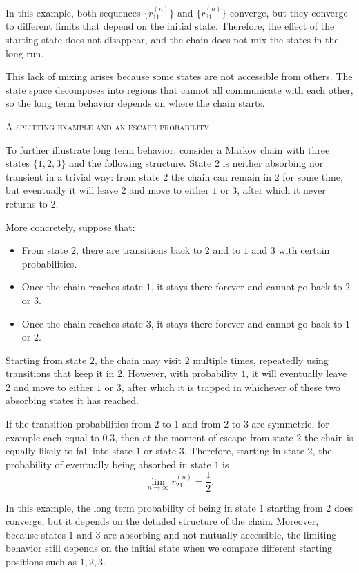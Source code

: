 In this example, both sequences \(\{r_{11}^{(n)}\}\) and \(\{r_{31}^{(n)}\}\) converge, but they converge to different limits that depend on the initial state.
Therefore, the effect of the starting state does not disappear, and the chain does not mix the states in the long run.

This lack of mixing arises because some states are not accessible from others.
The state space decomposes into regions that cannot all communicate with each other, so the long term behavior depends on where the chain starts.

\bigskip
\textsc{A splitting example and an escape probability}

To further illustrate long term behavior, consider a Markov chain with three states \(\{1,2,3\}\) and the following structure.
State \(2\) is neither absorbing nor transient in a trivial way: from state \(2\) the chain can remain in \(2\) for some time, but eventually it will leave \(2\) and move to either \(1\) or \(3\), after which it never returns to \(2\).

More concretely, suppose that:
\begin{itemize}
\item From state \(2\), there are transitions back to \(2\) and to \(1\) and \(3\) with certain probabilities.
\item Once the chain reaches state \(1\), it stays there forever and cannot go back to \(2\) or \(3\).
\item Once the chain reaches state \(3\), it stays there forever and cannot go back to \(1\) or \(2\).
\end{itemize}

Starting from state \(2\), the chain may visit \(2\) multiple times, repeatedly using transitions that keep it in \(2\).
However, with probability \(1\), it will eventually leave \(2\) and move to either \(1\) or \(3\), after which it is trapped in whichever of these two absorbing states it has reached.

If the transition probabilities from \(2\) to \(1\) and from \(2\) to \(3\) are symmetric, for example each equal to \(0.3\), then at the moment of escape from state \(2\) the chain is equally likely to fall into state \(1\) or state \(3\).
Therefore, starting in state \(2\), the probability of eventually being absorbed in state \(1\) is
\[
\lim_{n \to \infty} r_{21}^{(n)} = \frac{1}{2}.
\]

In this example, the long term probability of being in state \(1\) starting from \(2\) does converge, but it depends on the detailed structure of the chain.
Moreover, because states \(1\) and \(3\) are absorbing and not mutually accessible, the limiting behavior still depends on the initial state when we compare different starting positions such as \(1,2,3\).

